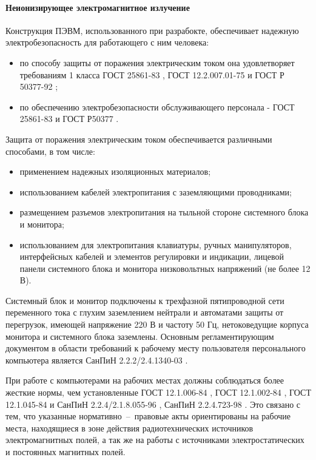 \paragraph{Неионизирующее электромагнитное излучение}

Конструкция ПЭВМ, использованного при разрабокте, обеспечивает надежную
электробезопасность для работающего с ним человека:

\begin{itemize}
    \item   по способу защиты от поражения электрическим током она удовлетворяет требованиям
            1 класса ГОСТ 25861-83 \cite{ecology_gost_25861_83}, ГОСТ 12.2.007.01-75
            \cite{ecology_gost_007_01_75} и ГОСТ Р 50377-92 \cite{ecology_gost_50377_92};

    \item   по обеспечению электробезопасности обслуживающего персонала - ГОСТ 25861-83
            \cite{ecology_gost_25861_83} и ГОСТ Р50377 \cite{ecology_gost_50377_92}.
\end{itemize}

Защита от поражения электрическим током обеспечивается различными способами,
в том числе:

\begin{itemize}
    \item   применением надежных изоляционных материалов;
    \item   использованием кабелей электропитания с заземляющими проводниками;
    \item   размещением разъемов электропитания на тыльной стороне системного блока
            и монитора;
    \item   использованием для электропитания клавиатуры, ручных манипуляторов,
            интерфейсных кабелей и элементов регулировки и индикации, лицевой панели
            системного блока и монитора низковольтных напряжений (не более 12 В).
\end{itemize}

Системный блок и монитор подключены к трехфазной пятипроводной сети переменного тока
с глухим заземлением нейтрали и автоматами защиты от перегрузок, имеющей
напряжение 220 В и частоту 50 Гц, нетоковедущие корпуса монитора и системного блока
заземлены. Основным регламентирующим документом в области требований к рабочему
месту пользователя персонального компьютера является СанПиН 2.2.2/2.4.1340-03
\cite{ecology_sanpin_1340_03}.

При работе с компьютерами на рабочих местах должны соблюдаться более жесткие нормы,
чем установленные ГОСТ 12.1.006-84 \cite{ecology_gost_006_84}, ГОСТ 12.1.002-84
\cite{ecology_gost_002_84}, ГОСТ 12.1.045-84 \cite{ecology_gost_045_84} и
СанПиН 2.2.4/2.1.8.055-96 \cite{ecology_sanpin_055_96}, СанПиН 2.2.4.723-98
\cite{ecology_sanpin_723_98}. Это связано с тем, что указанные нормативно~--~правовые
акты ориентированы на рабочие места, находящиеся в зоне действия радиотехнических
источников электромагнитных полей, а так же на работы с источниками электростатических
и постоянных магнитных полей.

